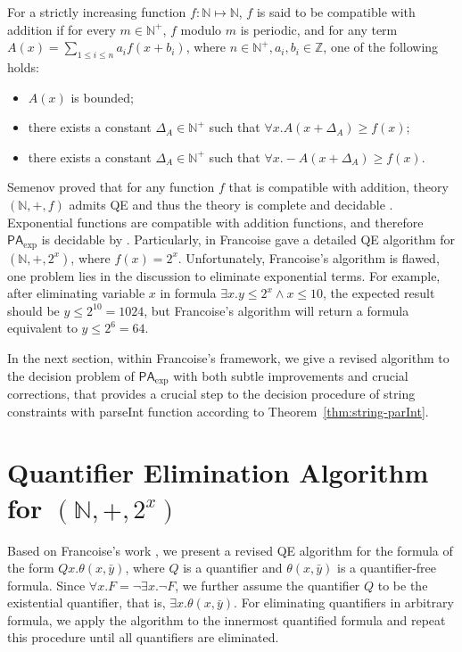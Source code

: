 \documentclass[runningheads]{llncs}
\newcommand{\znjSide}[1]{\todo[color=orange!10]{\textbf{ZHAN:} #1}}
\newcommand{\parseInt}{\textsf{parseInt}}
\newcommand{\paexp}{$\textsf{PA}_{\exp}$}
\begin{document}
\begin{definition}
    For a strictly increasing function $f:\mathbb{N}\mapsto \mathbb{N}$, 
    $f$ is said to be compatible with addition 
    if for every $m\in \mathbb{N}^+$,  $f$ modulo $m$ is periodic, 
    and for any term $A(x)=\sum_{1\le i\le n} a_i f(x+b_i)$, 
    where $n \in \mathbb{N}^+, a_i ,b_i \in \mathbb{Z}$,
    one of the following holds:
    \begin{itemize}
        \item $A(x)$ is bounded; 
        \item there exists a constant $\Delta_A\in \mathbb{N}^+$ such that 
        $\forall x. A(x+\Delta_A)\ge f(x)$;
        \item there exists a constant $\Delta_A\in \mathbb{N}^+$ such that 
        $\forall x. -A(x+\Delta_A)\ge f(x)$.
    \end{itemize}
\end{definition}


Semenov proved that for any function $f$ that is compatible with addition, 
theory $(\mathbb{N},+,f)$ admits QE  and thus the theory is complete and decidable \cite{Semenov}. 
Exponential functions are compatible with addition functions, and therefore {\paexp} is decidable 
by \cite{semenov}.
Particularly, in \cite{Francoise} Francoise gave a detailed QE algorithm for $(\mathbb{N},+,2^x)$, where $f(x)=2^x$.
Unfortunately, Francoise's algorithm is flawed, one problem 
 lies in the discussion to eliminate exponential terms. 
For example, after  eliminating variable $x$ in formula $\exists x. y\le 2^x \wedge x\le 10$,
the expected result should be $y\le 2^{10} =1024$,
but Francoise's algorithm will return a formula equivalent to $y \le 2^6=64$.

In the next section, within Francoise's framework, we give a revised algorithm
 to the decision problem of {\paexp} with 
both subtle improvements and crucial corrections, that 
provides a crucial step to the decision procedure of string constraints with {\parseInt} function according to 
Theorem~\ref{thm:string-parInt}. 



\section{Quantifier Elimination Algorithm for $(\mathbb{N},+,2^x)$}
Based on Francoise's work \cite{Francoise}, we present a  revised QE algorithm for the formula of the form $Qx.\theta(x,\bar{y})$, 
where $Q$ is a quantifier and $\theta(x,\bar{y})$ is a quantifier-free formula. 
Since $\forall x. F = \neg \exists x. \neg F$, we further assume the quantifier $Q$ to be the existential quantifier, 
that is, $\exists x.\theta(x,\bar{y})$. 
For eliminating quantifiers in arbitrary formula, 
we apply the algorithm to the innermost quantified formula and repeat this procedure until all quantifiers are eliminated.
\end{document}
